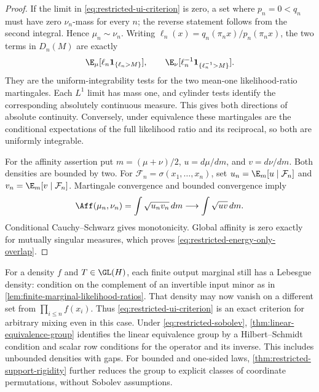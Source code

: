 \begin{proof}
If the limit in \eqref{eq:restricted-ui-criterion} is zero, a set
where \(p_n=0<q_n\) must have zero \(\nu_n\)-mass for every \(n\);
the reverse statement follows from the second integral.
Hence \(\mu_n\sim\nu_n\).
Writing \(\ell_n(x)=q_n(\pi_n x)/p_n(\pi_n x)\), the two terms in \(D_n(M)\) are exactly
\[
 \E_\mu[\ell_n\mathbf1_{\{\ell_n>M\}}],
 \qquad
 \E_\nu[\ell_n^{-1}\mathbf1_{\{\ell_n^{-1}>M\}}].
\]
They are the uniform-integrability tests for the two mean-one
likelihood-ratio martingales.
Each \(L^1\) limit has mass one, and cylinder tests identify the
corresponding absolutely continuous measure.
This gives both directions of absolute continuity.
Conversely, under equivalence these martingales are the conditional
expectations of the full likelihood ratio and its reciprocal, so both
are uniformly integrable.

For the affinity assertion put \(m=(\mu+\nu)/2\),
\(u=d\mu/dm\), and \(v=d\nu/dm\).
Both densities are bounded by two.
For \(\mathcal F_n=\sigma(x_1,\ldots,x_n)\), set
\(u_n=\E_m[u\mid\mathcal F_n]\) and
\(v_n=\E_m[v\mid\mathcal F_n]\).
Martingale convergence and bounded convergence imply
\[
 \Aff(\mu_n,\nu_n)
       =\int\sqrt{u_nv_n}\,dm
       \longrightarrow\int\sqrt{uv}\,dm.
\]
Conditional Cauchy--Schwarz gives monotonicity.
Global affinity is zero exactly for mutually singular measures,
which proves \eqref{eq:restricted-energy-only-overlap}.
\end{proof}

For a density \(f\) and \(T\in\GL(H)\), each finite output
marginal still has a Lebesgue density: condition on the complement
of an invertible input minor as in
\cref{lem:finite-marginal-likelihood-ratios}.
That density may now vanish on a different set from
\(\prod_{i\leq n}f(x_i)\).
Thus \eqref{eq:restricted-ui-criterion} is an exact criterion for
arbitrary mixing even in this case.
Under \eqref{eq:restricted-sobolev},
\cref{thm:linear-equivalence-group} identifies the linear equivalence
group by a Hilbert--Schmidt condition and scalar row conditions for the
operator and its inverse.  This includes unbounded densities with gaps.
For bounded and one-sided laws,
\cref{thm:restricted-support-rigidity} further reduces the group to
explicit classes of coordinate permutations, without Sobolev assumptions.

